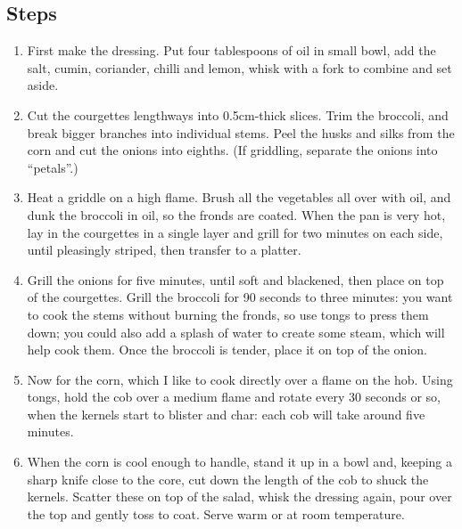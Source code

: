 \documentclass{book}
\begin{document}
\subsection*{Steps}
\begin{enumerate}
\item First make the dressing. Put four tablespoons of oil in small bowl, add the salt, cumin, coriander, chilli and lemon, whisk with a fork to combine and set aside.
\item Cut the courgettes lengthways into 0.5cm-thick slices. Trim the broccoli, and break bigger branches into individual stems. Peel the husks and silks from the corn and cut the onions into eighths. (If griddling, separate the onions into “petals”.)
\item Heat a griddle on a high flame. Brush all the vegetables all over with oil, and dunk the broccoli in oil, so the fronds are coated. When the pan is very hot, lay in the courgettes in a single layer and grill for two minutes on each side, until pleasingly striped, then transfer to a platter.
\item Grill the onions for five minutes, until soft and blackened, then place on top of the courgettes. Grill the broccoli for 90 seconds to three minutes: you want to cook the stems without burning the fronds, so use tongs to press them down; you could also add a splash of water to create some steam, which will help cook them. Once the broccoli is tender, place it on top of the onion.
\item Now for the corn, which I like to cook directly over a flame on the hob. Using tongs, hold the cob over a medium flame and rotate every 30 seconds or so, when the kernels start to blister and char: each cob will take around five minutes.
\item When the corn is cool enough to handle, stand it up in a bowl and, keeping a sharp knife close to the core, cut down the length of the cob to shuck the kernels. Scatter these on top of the salad, whisk the dressing again, pour over the top and gently toss to coat. Serve warm or at room temperature.
\end{enumerate}
\newpage
\end{document}
